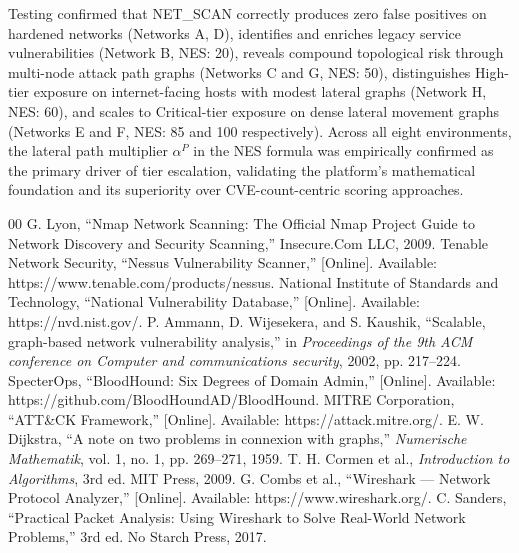 \documentclass[conference]{IEEEtran}
\begin{document}
Testing confirmed that NET\_SCAN correctly produces zero false positives on hardened networks (Networks A, D), identifies and enriches legacy service vulnerabilities (Network B, NES: 20), reveals compound topological risk through multi-node attack path graphs (Networks C and G, NES: 50), distinguishes High-tier exposure on internet-facing hosts with modest lateral graphs (Network H, NES: 60), and scales to Critical-tier exposure on dense lateral movement graphs (Networks E and F, NES: 85 and 100 respectively). Across all eight environments, the lateral path multiplier $\alpha^{P}$ in the NES formula was empirically confirmed as the primary driver of tier escalation, validating the platform's mathematical foundation and its superiority over CVE-count-centric scoring approaches.

\begin{thebibliography}{00}
 G. Lyon, ``Nmap Network Scanning: The Official Nmap Project Guide to Network Discovery and Security Scanning,'' Insecure.Com LLC, 2009.
 Tenable Network Security, ``Nessus Vulnerability Scanner,'' [Online]. Available: https://www.tenable.com/products/nessus.
 National Institute of Standards and Technology, ``National Vulnerability Database,'' [Online]. Available: https://nvd.nist.gov/.
 P. Ammann, D. Wijesekera, and S. Kaushik, ``Scalable, graph-based network vulnerability analysis,'' in \emph{Proceedings of the 9th ACM conference on Computer and communications security}, 2002, pp. 217--224.
 SpecterOps, ``BloodHound: Six Degrees of Domain Admin,'' [Online]. Available: https://github.com/BloodHoundAD/BloodHound.
 MITRE Corporation, ``ATT\&CK Framework,'' [Online]. Available: https://attack.mitre.org/.
 E. W. Dijkstra, ``A note on two problems in connexion with graphs,'' \emph{Numerische Mathematik}, vol. 1, no. 1, pp. 269--271, 1959.
 T. H. Cormen et al., \emph{Introduction to Algorithms}, 3rd ed. MIT Press, 2009.
 G. Combs et al., ``Wireshark --- Network Protocol Analyzer,'' [Online]. Available: https://www.wireshark.org/.
 C. Sanders, ``Practical Packet Analysis: Using Wireshark to Solve Real-World Network Problems,'' 3rd ed. No Starch Press, 2017.
\end{thebibliography}
\end{document}
